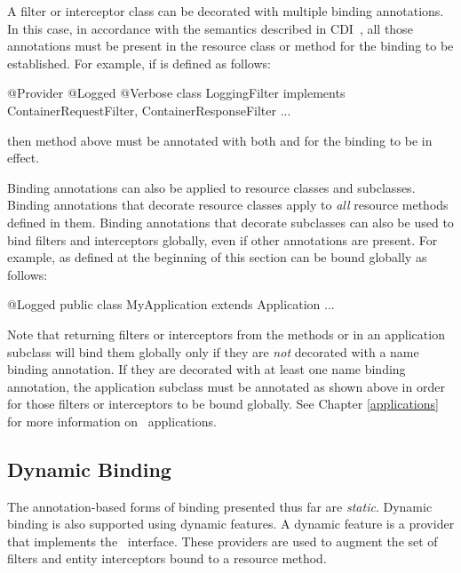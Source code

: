 A filter or interceptor class can be decorated with multiple binding annotations. In this case, in accordance with the semantics described in CDI~\cite{jsr299}, all those annotations must be present in the resource class or method for the binding to be established. For example, if  is defined as follows:

\begin{listing}{1}
@Provider
@Logged @Verbose
class LoggingFilter implements ContainerRequestFilter, 
                               ContainerResponseFilter {
    ...
}
\end{listing}

then method  above must be annotated with both  and  for the binding to be in effect.

Binding annotations can also be applied to resource classes and   subclasses. Binding annotations that decorate resource classes apply to \emph{all} resource methods defined in them. 
Binding annotations that decorate  subclasses can also be used to bind filters and interceptors globally, even if other annotations are present. For example,  as defined at the beginning of this section can be bound globally as follows:

\begin{listing}{1}
@Logged
public class MyApplication extends Application {
    ...
}
\end{listing}

Note that returning filters or interceptors from the methods  or  in an application subclass will bind them globally only if they are \emph{not} decorated with a name binding annotation. If they are decorated with at least one name binding annotation, the application subclass must be annotated as shown above in order for those filters or interceptors to be bound globally. See Chapter \ref{applications} for more information on \jaxrs\ applications.

\subsection{Dynamic Binding}
\label{dynamic_binding}

The annotation-based forms of binding presented thus far are {\em static}. Dynamic binding is also supported using dynamic features. A dynamic feature is a provider that implements the \DynamicFeature\ interface. These providers are used to augment the set of filters and entity interceptors bound to a resource method. 

